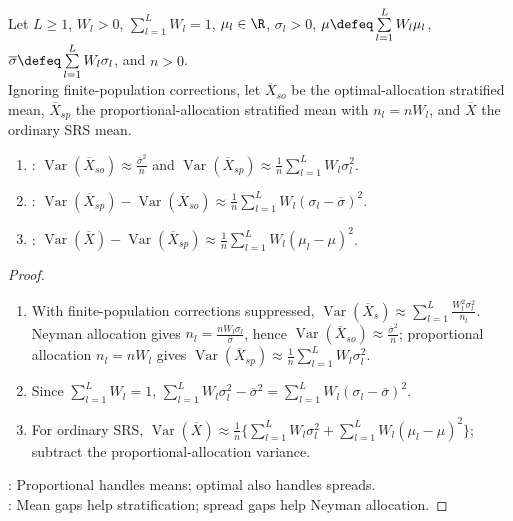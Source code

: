 \begin{corollary} \label{cor:stratified-allocation-comparisons} \\
Let $L\geq1$, $W_l>0$, $\sum\limits_{l=1}^{L}W_l=1$, $\mu_l\in\R$, $\sigma_l>0$, $\mu\defeq\sum\limits_{l=1}^{L}W_l\mu_l$, $\overline{\sigma}\defeq\sum\limits_{l=1}^{L}W_l\sigma_l$, and $n>0$.\\
Ignoring finite-population corrections, let $\overline{X}_{so}$ be the optimal-allocation stratified mean, $\overline{X}_{sp}$ the proportional-allocation stratified mean with $n_l=nW_l$, and $\overline{X}$ the ordinary SRS mean.
\begin{enumerate}[label=(\roman*)]
\setlength{\itemsep}{0pt}
\item {}: $\operatorname{Var}(\overline{X}_{so})\approx\frac{\overline{\sigma}^2}{n}$ and $\operatorname{Var}(\overline{X}_{sp})\approx\frac{1}{n}\sum\limits_{l=1}^{L}W_l\sigma_l^2$.
\item {}: $\operatorname{Var}(\overline{X}_{sp})-\operatorname{Var}(\overline{X}_{so})\approx\frac{1}{n}\sum\limits_{l=1}^{L}W_l(\sigma_l-\overline{\sigma})^2$.
\item {}: $\operatorname{Var}(\overline{X})-\operatorname{Var}(\overline{X}_{sp})\approx\frac{1}{n}\sum\limits_{l=1}^{L}W_l(\mu_l-\mu)^2$.
\end{enumerate}
\begin{proof}
\begin{enumerate}[label=(\roman*)]
\setlength{\itemsep}{0pt}
\item With finite-population corrections suppressed, $\operatorname{Var}(\overline{X}_s)\approx\sum\limits_{l=1}^{L}\frac{W_l^2\sigma_l^2}{n_l}$. Neyman allocation gives $n_l=\frac{nW_l\sigma_l}{\overline{\sigma}}$, hence $\operatorname{Var}(\overline{X}_{so})\approx\frac{\overline{\sigma}^2}{n}$; proportional allocation $n_l=nW_l$ gives $\operatorname{Var}(\overline{X}_{sp})\approx\frac{1}{n}\sum\limits_{l=1}^{L}W_l\sigma_l^2$.
\item Since $\sum\limits_{l=1}^{L}W_l=1$, $\sum\limits_{l=1}^{L}W_l\sigma_l^2-\overline{\sigma}^2=\sum\limits_{l=1}^{L}W_l(\sigma_l-\overline{\sigma})^2$.
\item For ordinary SRS, $\operatorname{Var}(\overline{X})\approx\frac{1}{n}\{\sum\limits_{l=1}^{L}W_l\sigma_l^2+\sum\limits_{l=1}^{L}W_l(\mu_l-\mu)^2\}$; subtract the proportional-allocation variance.
\end{enumerate}
: Proportional handles means; optimal also handles spreads.\\
: Mean gaps help stratification; spread gaps help Neyman allocation.
\end{proof}
\end{corollary}

